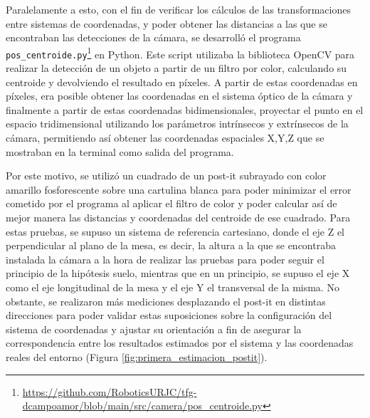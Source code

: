 Paralelamente a esto, con el fin de verificar los cálculos de las transformaciones entre sistemas de coordenadas, y poder obtener las distancias a las que se encontraban las detecciones de la cámara, se desarrolló el programa \verb|pos_centroide.py|\footnote{\url{https://github.com/RoboticsURJC/tfg-dcampoamor/blob/main/src/camera/pos_centroide.py}} en Python. Este script utilizaba la biblioteca OpenCV para realizar la detección de un objeto a partir de un filtro por color, calculando su centroide y devolviendo el resultado en píxeles. A partir de estas coordenadas en píxeles, era posible obtener las coordenadas en el sistema óptico de la cámara y finalmente a partir de estas coordenadas bidimensionales, proyectar el punto en el espacio tridimensional utilizando los parámetros intrínsecos y extrínsecos de la cámara, permitiendo así obtener las coordenadas espaciales X,Y,Z que se mostraban en la terminal como salida del programa. 

Por este motivo, se utilizó un cuadrado de un post-it subrayado con color amarillo fosforescente sobre una cartulina blanca para poder minimizar el error cometido por el programa al aplicar el filtro de color y poder calcular así de mejor manera las distancias y coordenadas del centroide de ese cuadrado. Para estas pruebas, se supuso un sistema de referencia cartesiano, donde el eje Z el perpendicular al plano de la mesa, es decir, la altura a la que se encontraba instalada la cámara a la hora de realizar las pruebas para poder seguir el principio de la hipótesis suelo, mientras que en un principio, se supuso el eje X como el eje longitudinal de la mesa y el eje Y el transversal de la misma. No obstante, se realizaron más mediciones desplazando el post-it en distintas direcciones para poder validar estas suposiciones sobre la configuración del sistema de coordenadas y ajustar su orientación a fin de asegurar la correspondencia entre los resultados estimados por el sistema y las coordenadas reales del entorno (Figura \ref{fig:primera_estimacion_postit}).

